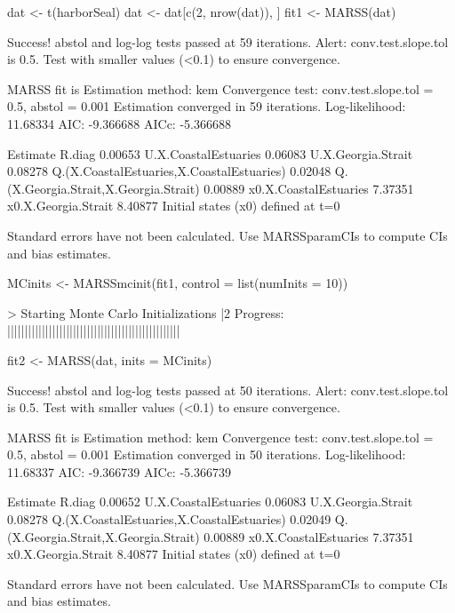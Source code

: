 \begin{Schunk}
\begin{Sinput}
 dat <- t(harborSeal)
 dat <- dat[c(2, nrow(dat)), ]
 fit1 <- MARSS(dat)
\end{Sinput}
\begin{Soutput}
Success! abstol and log-log tests passed at 59 iterations.
Alert: conv.test.slope.tol is 0.5.
Test with smaller values (<0.1) to ensure convergence.

MARSS fit is
Estimation method: kem 
Convergence test: conv.test.slope.tol = 0.5, abstol = 0.001
Estimation converged in 59 iterations. 
Log-likelihood: 11.68334 
AIC: -9.366688   AICc: -5.366688   
 
                                          Estimate
R.diag                                     0.00653
U.X.CoastalEstuaries                       0.06083
U.X.Georgia.Strait                         0.08278
Q.(X.CoastalEstuaries,X.CoastalEstuaries)  0.02048
Q.(X.Georgia.Strait,X.Georgia.Strait)      0.00889
x0.X.CoastalEstuaries                      7.37351
x0.X.Georgia.Strait                        8.40877
Initial states (x0) defined at t=0

Standard errors have not been calculated. 
Use MARSSparamCIs to compute CIs and bias estimates.
\end{Soutput}
\begin{Sinput}
 MCinits <- MARSSmcinit(fit1, control = list(numInits = 10))
\end{Sinput}
\begin{Soutput}
> Starting Monte Carlo Initializations
          |2%
Progress: ||||||||||||||||||||||||||||||||||||||||||||||||||
\end{Soutput}
\begin{Sinput}
 fit2 <- MARSS(dat, inits = MCinits)
\end{Sinput}
\begin{Soutput}
Success! abstol and log-log tests passed at 50 iterations.
Alert: conv.test.slope.tol is 0.5.
Test with smaller values (<0.1) to ensure convergence.

MARSS fit is
Estimation method: kem 
Convergence test: conv.test.slope.tol = 0.5, abstol = 0.001
Estimation converged in 50 iterations. 
Log-likelihood: 11.68337 
AIC: -9.366739   AICc: -5.366739   
 
                                          Estimate
R.diag                                     0.00652
U.X.CoastalEstuaries                       0.06083
U.X.Georgia.Strait                         0.08278
Q.(X.CoastalEstuaries,X.CoastalEstuaries)  0.02049
Q.(X.Georgia.Strait,X.Georgia.Strait)      0.00889
x0.X.CoastalEstuaries                      7.37351
x0.X.Georgia.Strait                        8.40877
Initial states (x0) defined at t=0

Standard errors have not been calculated. 
Use MARSSparamCIs to compute CIs and bias estimates.
\end{Soutput}
\end{Schunk}

